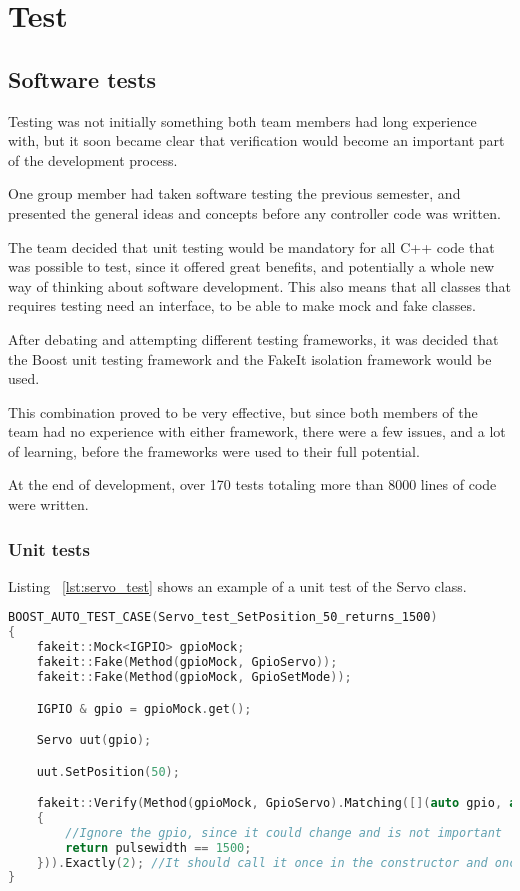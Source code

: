 \chapter{Test}
\label{sec:test}
\section{Software tests}
Testing was not initially something both team members had long experience with, but it soon became clear that verification would become an important part of the development process. 

One group member had taken software testing the previous semester, and presented the general ideas and concepts before any controller code was written. 

The team decided that unit testing would be mandatory for all C++ code that was possible to test, since it offered great benefits, and potentially a whole new way of thinking about software development. This also means that all classes that requires testing need an interface, to be able to make mock and fake classes.

After debating and attempting different testing frameworks, it was decided that the Boost unit testing framework and the FakeIt isolation framework would be used. 

This combination proved to be very effective, but since both members of the team had no experience with either framework, there were a few issues, and a lot of learning, before the frameworks were used to their full potential.

At the end of development, over 170 tests totaling more than 8000 lines of code were written. 

\subsection{Unit tests}

Listing ~\ref{lst:servo_test} shows an example of a unit test of the Servo class.

\begin{lstlisting}[caption = {Servo test of SetPosition}, captionpos=b, label={lst:servo_test}, language=C++,firstnumber=1]
BOOST_AUTO_TEST_CASE(Servo_test_SetPosition_50_returns_1500)
{
	fakeit::Mock<IGPIO> gpioMock;
	fakeit::Fake(Method(gpioMock, GpioServo));
	fakeit::Fake(Method(gpioMock, GpioSetMode));

	IGPIO & gpio = gpioMock.get();

	Servo uut(gpio);

	uut.SetPosition(50);

	fakeit::Verify(Method(gpioMock, GpioServo).Matching([](auto gpio, auto pulsewidth)
	{
		//Ignore the gpio, since it could change and is not important
		return pulsewidth == 1500;
	})).Exactly(2); //It should call it once in the constructor and once again when we set it.
}
\end{lstlisting}


